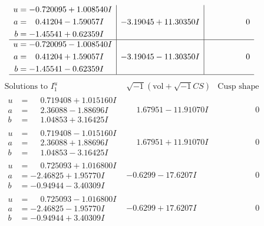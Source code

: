 \documentclass[1p]{elsarticle_modified}
\theoremstyle{definition}
\newcommand{\I}{\sqrt{-1}}
\begin{document}
$$\begin{array}{c|c|c}
\begin{aligned}
u &= -0.720095 + 1.008540 I \\
a &= \phantom{-}0.41204 - 1.59057 I \\
b &= -1.45541 + 0.62359 I\end{aligned}
 & -3.19045 + 11.30350 I & \phantom{-0.000000 } 0 \\ \hline\begin{aligned}
u &= -0.720095 - 1.008540 I \\
a &= \phantom{-}0.41204 + 1.59057 I \\
b &= -1.45541 - 0.62359 I\end{aligned}
 & -3.19045 - 11.30350 I & \phantom{-0.000000 } 0\\
 \hline 
 \end{array}$$\newpage$$\begin{array}{c|c|c}  
\text{Solutions to }I^u_{1}& \I (\text{vol} + \sqrt{-1}CS) & \text{Cusp shape}\\
 \hline 
\begin{aligned}
u &= \phantom{-}0.719408 + 1.015160 I \\
a &= \phantom{-}2.36088 - 1.88696 I \\
b &= \phantom{-}1.04853 + 3.16425 I\end{aligned}
 & \phantom{-}1.67951 - 11.91070 I & \phantom{-0.000000 } 0 \\ \hline\begin{aligned}
u &= \phantom{-}0.719408 - 1.015160 I \\
a &= \phantom{-}2.36088 + 1.88696 I \\
b &= \phantom{-}1.04853 - 3.16425 I\end{aligned}
 & \phantom{-}1.67951 + 11.91070 I & \phantom{-0.000000 } 0 \\ \hline\begin{aligned}
u &= \phantom{-}0.725093 + 1.016800 I \\
a &= -2.46825 + 1.95770 I \\
b &= -0.94944 - 3.40309 I\end{aligned}
 & -0.6299 - 17.6207 I & \phantom{-0.000000 } 0 \\ \hline\begin{aligned}
u &= \phantom{-}0.725093 - 1.016800 I \\
a &= -2.46825 - 1.95770 I \\
b &= -0.94944 + 3.40309 I\end{aligned}
 & -0.6299 + 17.6207 I & \phantom{-0.000000 } 0 \\ \hline\begin{aligned}

\end{aligned}
\end{array}$$
\end{document}
